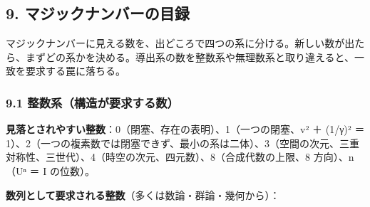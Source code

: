 \documentclass[
  a4paper,
]{ltjsarticle}
\begin{document}
\subsection{9.
マジックナンバーの目録}\label{ux30deux30b8ux30c3ux30afux30caux30f3ux30d0ux30fcux306eux76eeux9332}

マジックナンバーに見える数を、出どころで四つの系に分ける。新しい数が出たら、まずどの系かを決める。導出系の数を整数系や無理数系と取り違えると、一致を要求する罠に落ちる。

\subsubsection{9.1
整数系（構造が要求する数）}\label{ux6574ux6570ux7cfbux69cbux9020ux304cux8981ux6c42ux3059ux308bux6570}

\textbf{見落とされやすい整数}：0（閉塞、存在の表明）、1（一つの閉塞、v²
＋ (1/γ)² ＝
1）、2（一つの複素数では閉塞できず、最小の系は二体）、3（空間の次元、三重対称性、三世代）、4（時空の次元、四元数）、8（合成代数の上限、8
方向）、n（Uⁿ ＝ I の位数）。

\textbf{数列として要求される整数}（多くは数論・群論・幾何から）：
\end{document}

